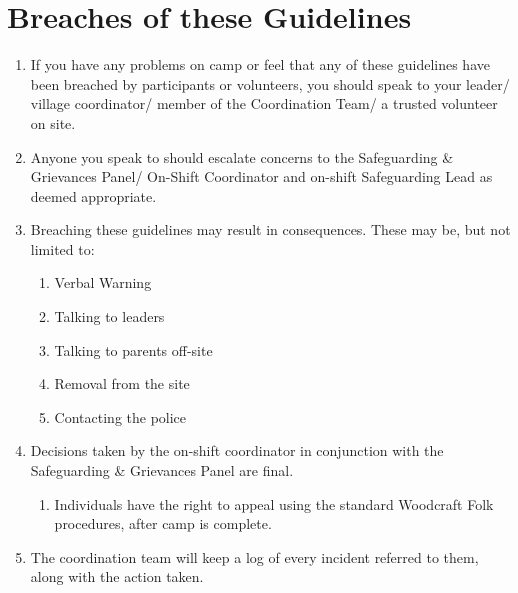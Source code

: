 \documentclass[a4paper, 11pt]{report}
\def\enumMarginIndentOne{4em}
\begin{document}
    \chapter{Breaches of these Guidelines}
    \begin{enumerate}
        \item If you have any problems on camp or feel that any of these guidelines have been breached by participants or volunteers, you should speak to your leader/ village coordinator/ member of the Coordination Team/ a trusted volunteer on site.
        \item Anyone you speak to should escalate concerns to the Safeguarding \& Grievances Panel/ On-Shift Coordinator and on-shift Safeguarding Lead as deemed appropriate.
        \item Breaching these guidelines may result in consequences. These may be, but not limited to:
        \begin{enumerate}[leftmargin=\enumMarginIndentOne]
            \item Verbal Warning
            \item Talking to leaders
            \item Talking to parents off-site
            \item Removal from the site
            \item Contacting the police
        \end{enumerate}
        \item Decisions taken by the on-shift coordinator in conjunction with the Safeguarding \& Grievances Panel are final.
        \begin{enumerate}[leftmargin=\enumMarginIndentOne]
            \item Individuals have the right to appeal using the standard Woodcraft Folk procedures, after camp is complete.
        \end{enumerate}
        \item The coordination team will keep a log of every incident referred to them, along with the action taken. 
    \end{enumerate}

    \backPagebw
\end{document}
